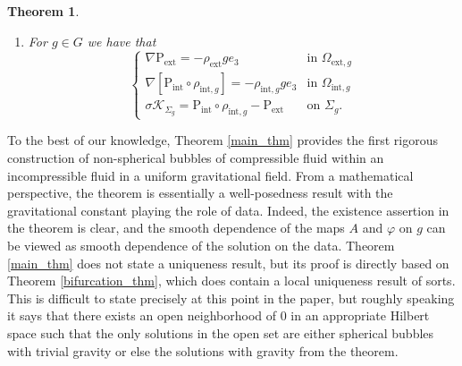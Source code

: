\documentclass[11pt,reqno]{amsart}
\numberwithin{equation}{section}
\def\nab{\nabla}
\def\nab{\nabla}
\newcommand{\m}{\mathrm}
\def\pint{\m{P}_{\m{int}}}
\def\pext{\m{P}_{\m{ext}}}
\newtheorem{thm}[lem]{Theorem}
\begin{document}
\begin{thm}
\begin{enumerate}
 \item For $g \in G$ we have that 
\begin{equation}
\begin{cases}
\nab \pext = - \rho_{\m{ext}} g e_3 &\text{in } \Omega_{\m{ext},g} \\ 
\nab [\pint \circ \rho_{\m{int},g}] =  - \rho_{\m{int},g} g e_3 &\text{in } \Omega_{\m{int},g}  \\
\sigma \mathscr{K}_{\Sigma_g} = \pint\circ \rho_{\m{int},g} - \pext &\text{on } \Sigma_g.
\end{cases}
\end{equation}
\end{enumerate}

\end{thm}


To the best of our knowledge, Theorem \ref{main_thm} provides the first rigorous construction of non-spherical  bubbles of compressible fluid within an incompressible fluid in a uniform gravitational field.   From a mathematical perspective, the theorem is essentially a well-posedness result with the gravitational constant playing the role of data.  Indeed, the existence assertion in the theorem is clear, and the smooth dependence of the maps $A$ and $\varphi$ on $g$ can be viewed as smooth dependence of the solution on the data.  Theorem \ref{main_thm} does not state a uniqueness result, but its proof is directly based on Theorem \ref{bifurcation_thm}, which does contain a local uniqueness result of sorts.  This is difficult to state precisely at this point in the paper, but roughly speaking it says that there exists an open neighborhood of $0$ in an appropriate Hilbert space such that the only solutions in the open set are either spherical bubbles with trivial gravity or else the solutions with gravity from the theorem.
\end{document}
